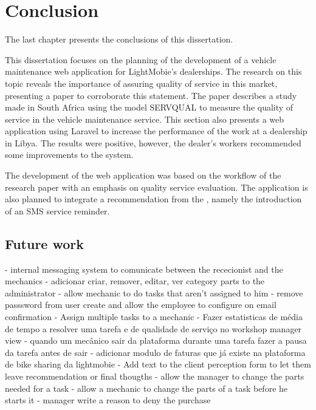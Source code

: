 \chapter{Conclusion}%
\label{chapter:conclusion}

\begin{introduction}
The last chapter presents the conclusions of this dissertation.
\end{introduction} 


This dissertation focuses on the planning of the development of a vehicle maintenance web application for LightMobie's dealerships. 
The research on this topic reveals the importance of assuring quality of service in this market, presenting a paper to corroborate this statement.
The paper describes a study made in South Africa using the model SERVQUAL to measure the quality of service in the vehicle maintenance service.
This section also presents a web application using Laravel to increase the performance of the work at a dealership in Libya. 
The results were positive, however, the dealer's workers recommended some improvements to the system.

The development of the web application was based on the workflow of the research paper with an emphasis on quality service evaluation.
The application is also planned to integrate a recommendation from the \citet{MAS_MOTORS}, namely the introduction of an SMS service reminder. 


\section{Future work}

- internal messaging system to comunicate between the rececionist and the mechanics
- adicionar criar, remover, editar, ver category parts to the administrator
- allow mechanic to do tasks that aren't assigned to him
- remove passsword from user create and allow the employee to configure on email confirmation
- Assign multiple tasks to a mechanic
- Fazer estatisticas de média de tempo a resolver uma tarefa e de qualidade de serviço no workshop manager view
- quando um mecânico sair da plataforma durante uma tarefa fazer a pausa da tarefa antes de sair
- adicionar modulo de faturas que já existe na plataforma de bike sharing da lightmobie
- Add text to the client perception form to let them leave recommendation or final thougths
- allow the manager to change the parts needed for a task
- allow a mechanic to change the parts of a task before he starts it
- manager write a reason to deny the purchase